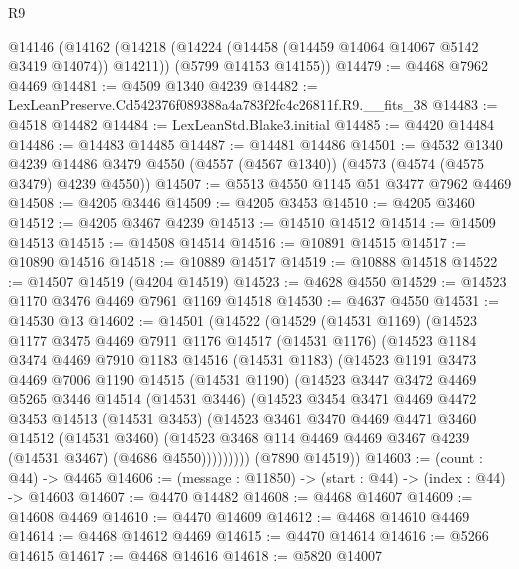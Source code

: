 \begin{lexlean}{R9}
\begin{coremodule}
  @14146
    (@14162
      (@14218 (@14224 (@14458 (@14459 @14064 @14067 @5142 @3419 @14074)) @14211))
      (@5799 @14153 @14155))
@14479 := @4468 @7962 @4469
@14481 := @4509 @1340 @4239
@14482 := LexLeanPreserve.Cd542376f089388a4a783f2fc4c26811f.R9.__fits_38
@14483 := @4518 @14482
@14484 := LexLeanStd.Blake3.initial
@14485 := @4420 @14484
@14486 := @14483 @14485
@14487 := @14481 @14486
@14501 := @4532
    @1340
    @4239
    @14486
    @3479
    @4550
    (@4557 (@4567 @1340))
    (@4573 (@4574 (@4575 @3479) @4239 @4550))
@14507 := @5513 @4550 @1145 @51 @3477 @7962 @4469
@14508 := @4205 @3446
@14509 := @4205 @3453
@14510 := @4205 @3460
@14512 := @4205 @3467 @4239
@14513 := @14510 @14512
@14514 := @14509 @14513
@14515 := @14508 @14514
@14516 := @10891 @14515
@14517 := @10890 @14516
@14518 := @10889 @14517
@14519 := @10888 @14518
@14522 := @14507 @14519 (@4204 @14519)
@14523 := @4628 @4550
@14529 := @14523 @1170 @3476 @4469 @7961 @1169 @14518
@14530 := @4637 @4550
@14531 := @14530 @13
@14602 := @14501
    (@14522
      (@14529
        (@14531 @1169)
        (@14523
          @1177
          @3475
          @4469
          @7911
          @1176
          @14517
          (@14531 @1176)
          (@14523
            @1184
            @3474
            @4469
            @7910
            @1183
            @14516
            (@14531 @1183)
            (@14523
              @1191
              @3473
              @4469
              @7006
              @1190
              @14515
              (@14531 @1190)
              (@14523
                @3447
                @3472
                @4469
                @5265
                @3446
                @14514
                (@14531 @3446)
                (@14523
                  @3454
                  @3471
                  @4469
                  @4472
                  @3453
                  @14513
                  (@14531 @3453)
                  (@14523
                    @3461
                    @3470
                    @4469
                    @4471
                    @3460
                    @14512
                    (@14531 @3460)
                    (@14523 @3468 @114 @4469 @4469 @3467 @4239 (@14531 @3467) (@4686 @4550)))))))))
      (@7890 @14519))
@14603 := (count : @44) -> @4465
@14606 := (message : @11850) -> (start : @44) -> (index : @44) -> @14603
@14607 := @4470 @14482
@14608 := @4468 @14607
@14609 := @14608 @4469
@14610 := @4470 @14609
@14612 := @4468 @14610 @4469
@14614 := @4468 @14612 @4469
@14615 := @4470 @14614
@14616 := @5266 @14615
@14617 := @4468 @14616
@14618 := @5820 @14007

\end{coremodule}
\end{lexlean}
